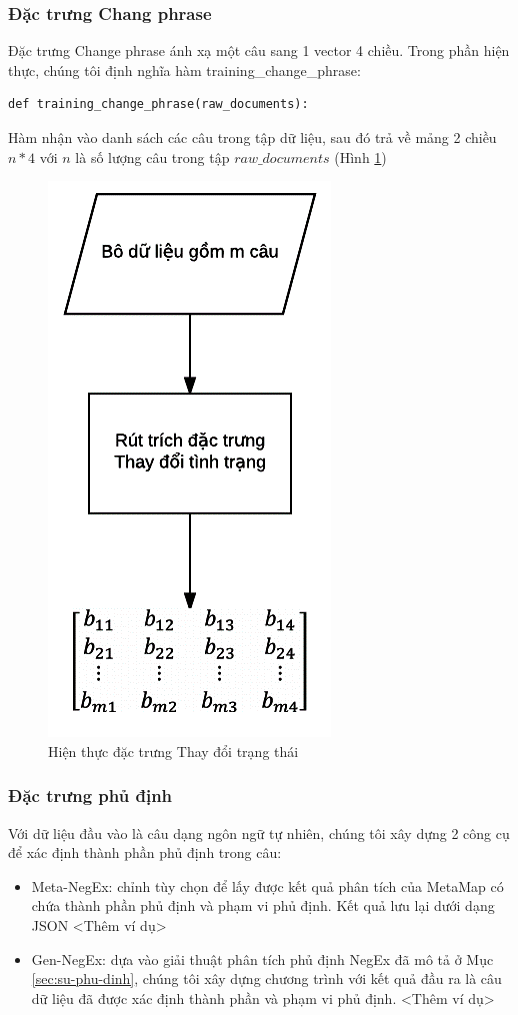 \subsubsection*{Đặc trưng Chang phrase}
Đặc trưng Change phrase ánh xạ một câu sang 1 vector 4 chiều. Trong phần hiện thực, chúng tôi định nghĩa hàm training\_change\_phrase:
\begin{lstlisting}
def training_change_phrase(raw_documents):
\end{lstlisting}
Hàm nhận vào danh sách các câu trong tập dữ liệu, sau đó trả về mảng 2 chiều $n*4$ với $n$ là số lượng câu trong tập $raw\_documents$ (Hình \ref{fig:hien-thuc-changephrase})
\begin{figure}
\centering
\includegraphics[scale=0.5]{../hinh/hien_thuc_changephrase.png}
\caption{Hiện thực đặc trưng Thay đổi trạng thái} \label{fig:hien-thuc-changephrase}
\end{figure}
\subsubsection*{Đặc trưng phủ định}
Với dữ liệu đầu vào là câu dạng ngôn ngữ tự nhiên, chúng tôi xây dựng 2 công cụ để xác định thành phần phủ định trong câu:
\begin{itemize}
\item Meta-NegEx: chỉnh tùy chọn  để lấy được kết quả phân tích của MetaMap có chứa thành phần phủ định và phạm vi phủ định. Kết quả lưu lại dưới dạng JSON <Thêm ví dụ>
\item Gen-NegEx: dựa vào giải thuật phân tích phủ định NegEx đã mô tả ở Mục \ref{sec:su-phu-dinh}, chúng tôi xây dựng chương trình với kết quả đầu ra là câu dữ liệu đã được xác định thành phần và phạm vi phủ định. <Thêm ví dụ>
\end{itemize}

